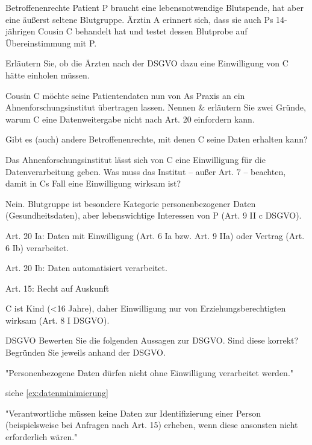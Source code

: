 \documentclass{article}
\begin{document}
\begin{eexercises}{Betroffenenrechte}{
    Patient P braucht eine lebensnotwendige Blutspende, hat aber eine äußerst seltene Blutgruppe. Ärztin A erinnert sich, dass sie auch Ps 14-jährigen Cousin C behandelt hat und testet dessen Blutprobe auf Übereinstimmung mit P.
  }
  \item Erläutern Sie, ob die Ärzten nach der DSGVO dazu eine Einwilligung von C hätte einholen müssen.
  \item Cousin C möchte seine Patientendaten nun von As Praxis an ein Ahnenforschungsinstitut übertragen lassen. Nennen \& erläutern Sie zwei Gründe, warum C eine Datenweitergabe nicht nach Art. 20 einfordern kann.
  \item Gibt es (auch) andere Betroffenenrechte, mit denen C seine Daten erhalten kann?
  \item Das Ahnenforschungsinstitut lässt sich von C eine Einwilligung für die Datenverarbeitung geben. Was muss das Institut – außer Art. 7 – beachten, damit in Cs Fall eine Einwilligung wirksam ist?
\end{eexercises}

\begin{solutions}
  \item Nein. Blutgruppe ist besondere Kategorie personenbezogener Daten (Gesundheitsdaten), aber lebenswichtige Interessen von P (Art. 9 II c DSGVO).
  \item Art. 20 Ia: Daten mit Einwilligung (Art. 6 Ia bzw. Art. 9 IIa) oder Vertrag (Art. 6 Ib) verarbeitet.\xmark\par
  Art. 20 Ib: Daten automatisiert verarbeitet. \xmark
  \item Art. 15: Recht auf Auskunft
  \item C ist Kind (<16 Jahre), daher Einwilligung nur von Erziehungsberechtigten wirksam (Art. 8 I DSGVO).
\end{solutions}

\begin{eexercises}{DSGVO}{
    Bewerten Sie die folgenden Aussagen zur DSGVO. Sind diese korrekt? Begründen Sie jeweils anhand der DSGVO.
  }
  \item "Personenbezogene Daten dürfen nicht ohne Einwilligung verarbeitet werden."
  \item siehe \ref{ex:datenminimierung}
  \item "Verantwortliche müssen keine Daten zur Identifizierung einer Person (beispielsweise bei Anfragen nach Art. 15) erheben, wenn diese ansonsten nicht erforderlich wären."
\end{eexercises}
\end{document}

